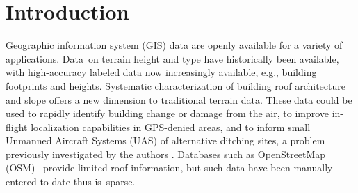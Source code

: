 \section{Introduction}
Geographic information system (GIS) data are openly available for a variety of applications. Data~on terrain height and type have historically been available, with high-accuracy labeled data now increasingly available, e.g., building footprints and heights.  Systematic characterization of building roof architecture and slope offers a new dimension to traditional terrain data.  These data could be used to rapidly identify building change or damage from the air, to improve in-flight localization capabilities in GPS-denied areas, and to inform small Unmanned Aircraft Systems (UAS) of alternative ditching sites, a problem previously investigated by the authors \cite{ochoa_fail-safe_2017, castagno_comprehensive_2018}.   Databases such as OpenStreetMap (OSM)~\cite{openstreetmap_contributors_planet_2017} provide limited roof information, but such data have been manually entered to-date thus is~sparse. 

